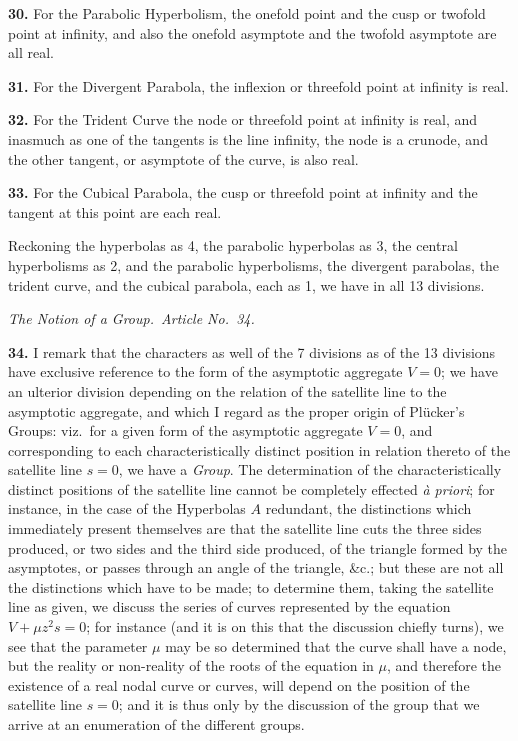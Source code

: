 \documentclass[11pt,a4paper]{article}
\begin{document}
\medskip

\textbf{30.} For the Parabolic Hyperbolism, the onefold point and the cusp or twofold point at infinity, and also the onefold asymptote and the twofold asymptote are all real.

\medskip

\textbf{31.} For the Divergent Parabola, the inflexion or threefold point at infinity is real.

\medskip

\textbf{32.} For the Trident Curve the node or threefold point at infinity is real, and inasmuch as one of the tangents is the line infinity, the node is a crunode, and the other tangent, or asymptote of the curve, is also real.

\medskip

\textbf{33.} For the Cubical Parabola, the cusp or threefold point at infinity and the tangent at this point are each real.

\medskip

Reckoning the hyperbolas as 4, the parabolic hyperbolas as 3, the central hyperbolisms as 2, and the parabolic hyperbolisms, the divergent parabolas, the trident curve, and the cubical parabola, each as 1, we have in all 13 divisions.

\medskip

\noindent\textit{The Notion of a Group.\ Article No.\ 34.}

\medskip

\textbf{34.} I remark that the characters as well of the 7 divisions as of the 13 divisions have exclusive reference to the form of the asymptotic aggregate $V=0$; we have an ulterior division depending on the relation of the satellite line to the asymptotic aggregate, and which I regard as the proper origin of Pl\"ucker's Groups: viz.\ for a given form of the asymptotic aggregate $V=0$, and corresponding to each characteristically distinct position in relation thereto of the satellite line $s=0$, we have a \emph{Group}. The determination of the characteristically distinct positions of the satellite line cannot be completely effected \emph{\`a priori}; for instance, in the case of the Hyperbolas $A$ redundant, the distinctions which immediately present themselves are that the satellite line cuts the three sides produced, or two sides and the third side produced, of the triangle formed by the asymptotes, or passes through an angle of the triangle, \&c.; but these are not all the distinctions which have to be made; to determine them, taking the satellite line as given, we discuss the series of curves represented by the equation $V + \mu z^{2}s = 0$; for instance (and it is on this that the discussion chiefly turns), we see that the parameter $\mu$ may be so determined that the curve shall have a node, but the reality or non-reality of the roots of the equation in $\mu$, and therefore the existence of a real nodal curve or curves, will depend on the position of the satellite line $s=0$; and it is thus only by the discussion of the group that we arrive at an enumeration of the different groups.
\end{document}
